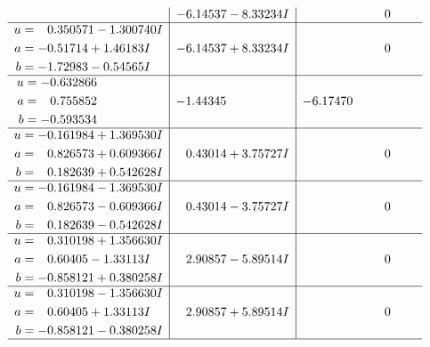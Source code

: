 \documentclass[1p]{elsarticle_modified}
\theoremstyle{definition}
\begin{document}
$$\begin{array}{c|c|c}
 & -6.14537 - 8.33234 I & \phantom{-0.000000 } 0 \\ \hline\begin{aligned}
u &= \phantom{-}0.350571 - 1.300740 I \\
a &= -0.51714 + 1.46183 I \\
b &= -1.72983 - 0.54565 I\end{aligned}
 & -6.14537 + 8.33234 I & \phantom{-0.000000 } 0 \\ \hline\begin{aligned}
u &= -0.632866\phantom{ +0.000000I} \\
a &= \phantom{-}0.755852\phantom{ +0.000000I} \\
b &= -0.593534\phantom{ +0.000000I}\end{aligned}
 & -1.44345\phantom{ +0.000000I} & -6.17470\phantom{ +0.000000I} \\ \hline\begin{aligned}
u &= -0.161984 + 1.369530 I \\
a &= \phantom{-}0.826573 + 0.609366 I \\
b &= \phantom{-}0.182639 + 0.542628 I\end{aligned}
 & \phantom{-}0.43014 + 3.75727 I & \phantom{-0.000000 } 0 \\ \hline\begin{aligned}
u &= -0.161984 - 1.369530 I \\
a &= \phantom{-}0.826573 - 0.609366 I \\
b &= \phantom{-}0.182639 - 0.542628 I\end{aligned}
 & \phantom{-}0.43014 - 3.75727 I & \phantom{-0.000000 } 0 \\ \hline\begin{aligned}
u &= \phantom{-}0.310198 + 1.356630 I \\
a &= \phantom{-}0.60405 - 1.33113 I \\
b &= -0.858121 + 0.380258 I\end{aligned}
 & \phantom{-}2.90857 - 5.89514 I & \phantom{-0.000000 } 0 \\ \hline\begin{aligned}
u &= \phantom{-}0.310198 - 1.356630 I \\
a &= \phantom{-}0.60405 + 1.33113 I \\
b &= -0.858121 - 0.380258 I\end{aligned}
 & \phantom{-}2.90857 + 5.89514 I & \phantom{-0.000000 } 0\\
 \hline 
 \end{array}$$\newpage$$\begin{array}{c|c|c}  

\end{array}$$
\end{document}
